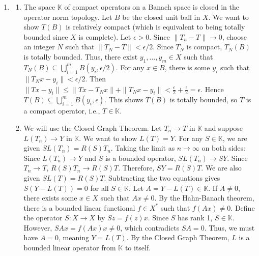 \documentclass{article}
\begin{document}
\begin{enumerate}[label=\fbox{\arabic*}]
  \item %
        \begin{enumerate}[label=(\arabic*)]
          \item The space $\mathbb{K}$ of compact operators on a Banach space is closed in the operator norm topology.
                Let $B$ be the closed unit ball in $X$. We want to show $T(B)$ is relatively compact (which is equivalent to being totally bounded since $X$ is complete).
                Let $\epsilon > 0$. Since $\|T_n - T\| \to 0$, choose an integer $N$ such that $\|T_N - T\| < \epsilon/2$.
                Since $T_N$ is compact, $T_N(B)$ is totally bounded. Thus, there exist $y_1, \dots, y_m \in X$ such that $T_N(B) \subseteq \bigcup_{i=1}^m B(y_i, \epsilon/2)$.
                For any $x \in B$, there is some $y_i$ such that $\|T_N x - y_i\| < \epsilon/2$.
                Then $\|T x - y_i\| \le \|Tx - T_N x\| + \|T_N x - y_i\| < \frac{\epsilon}{2} + \frac{\epsilon}{2} = \epsilon$.
                Hence $T(B) \subseteq \bigcup_{i=1}^m B(y_i, \epsilon)$. This shows $T(B)$ is totally bounded, so $T$ is a compact operator, i.e., $T \in \mathbb{K}$.
          \item We will use the Closed Graph Theorem. Let $T_n \to T$ in $\mathbb{K}$ and suppose $L(T_n) \to Y$ in $\mathbb{K}$. We want to show $L(T) = Y$.
                For any $S \in \mathbb{K}$, we are given $S L(T_n) = R(S) T_n$.
                Taking the limit as $n \to \infty$ on both sides:
                Since $L(T_n) \to Y$ and $S$ is a bounded operator, $S L(T_n) \to S Y$.
                Since $T_n \to T$, $R(S) T_n \to R(S) T$.
                Therefore, $S Y = R(S) T$.
                We are also given $S L(T) = R(S) T$.
                Subtracting the two equations gives $S (Y - L(T)) = 0$ for all $S \in \mathbb{K}$.
                Let $A = Y - L(T) \in \mathbb{K}$. If $A \neq 0$, there exists some $x \in X$ such that $Ax \neq 0$.
                By the Hahn-Banach theorem, there is a bounded linear functional $f \in X^*$ such that $f(Ax) \neq 0$.
                Define the operator $S: X \to X$ by $Sz = f(z)x$. Since $S$ has rank 1, $S \in \mathbb{K}$.
                However, $SAx = f(Ax)x \neq 0$, which contradicts $SA = 0$.
                Thus, we must have $A = 0$, meaning $Y = L(T)$.
                By the Closed Graph Theorem, $L$ is a bounded linear operator from $\mathbb{K}$ to itself.
        \end{enumerate}


\end{enumerate}
\end{document}
